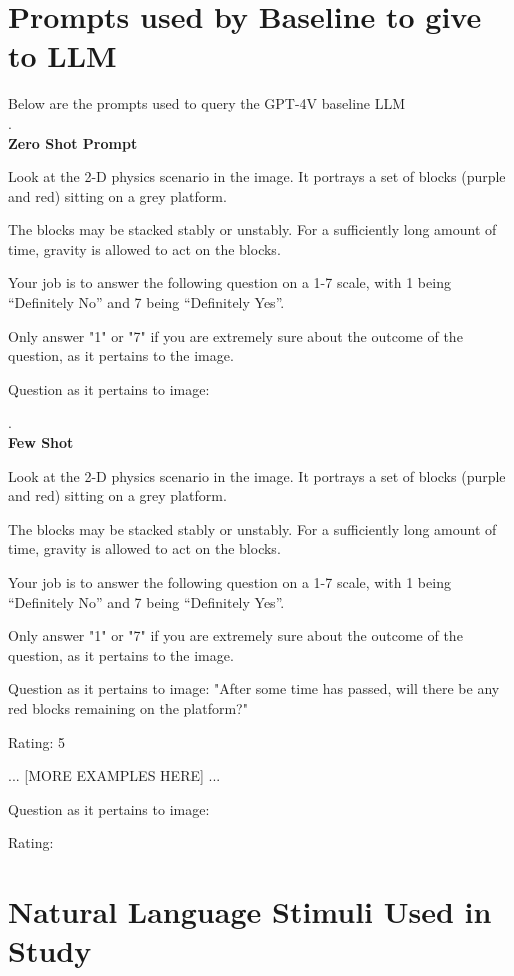 \documentclass[10pt,letterpaper]{article}
\begin{document}
\newpage
\section{Prompts used by Baseline to give to LLM}
\label{app:BaselineLLM_prompts}

Below are the prompts used to query the GPT-4V baseline LLM \\.
\\
\textbf{Zero Shot Prompt}
\begin{displayquote}
    Look at the 2-D physics scenario in the image. It portrays a set of blocks (purple and red) sitting on a grey platform.

The blocks may be stacked stably or unstably. For a sufficiently long amount of time, gravity is allowed to act on the blocks.

Your job is to answer the following question on a 1-7 scale, with 1 being “Definitely No” and 7 being “Definitely Yes”. 

Only answer "1" or "7" if you are extremely sure about the outcome of the question, as it pertains to the image.

Question as it pertains to image:
\end{displayquote}.
\\
\textbf{Few Shot}
\begin{displayquote}
    Look at the 2-D physics scenario in the image. It portrays a set of blocks (purple and red) sitting on a grey platform.

The blocks may be stacked stably or unstably. For a sufficiently long amount of time, gravity is allowed to act on the blocks.

Your job is to answer the following question on a 1-7 scale, with 1 being “Definitely No” and 7 being “Definitely Yes”. 

Only answer "1" or "7" if you are extremely sure about the outcome of the question, as it pertains to the image.

Question as it pertains to image: "After some time has passed, will there be any red blocks remaining on the platform?"

Rating: 5

... [MORE EXAMPLES HERE] ...

Question as it pertains to image:

Rating:
\end{displayquote}

\newpage
\section{Natural Language Stimuli Used in Study}
\label{app:language_stimuli}
\end{document}
